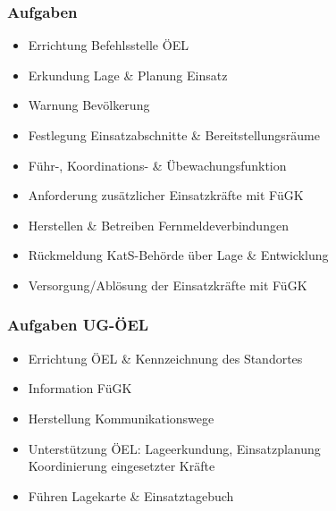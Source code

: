\begin{normbox}{\subsubsection{Aufgaben}}
    \begin{itemize}
        \item Errichtung Befehlsstelle ÖEL
        \item Erkundung Lage \& Planung Einsatz
        \item Warnung Bevölkerung
        \item Festlegung Einsatzabschnitte \& Bereitstellungsräume
        \item Führ-, Koordinations- \& Übewachungsfunktion
        \item Anforderung zusätzlicher Einsatzkräfte mit FüGK
        \item Herstellen \& Betreiben Fernmeldeverbindungen
        \item Rückmeldung KatS-Behörde über Lage \& Entwicklung
        \item Versorgung/Ablösung der Einsatzkräfte mit FüGK
    \end{itemize}
\end{normbox}
\begin{normbox}{\subsubsection{Aufgaben UG-ÖEL}}
    \begin{itemize}
        \item Errichtung ÖEL \& Kennzeichnung des Standortes
        \item Information FüGK
        \item Herstellung Kommunikationswege
        \item Unterstützung ÖEL: Lageerkundung, Einsatzplanung\\
        \ra Koordinierung eingesetzter Kräfte
        \item Führen Lagekarte \& Einsatztagebuch
    \end{itemize}
\end{normbox}
